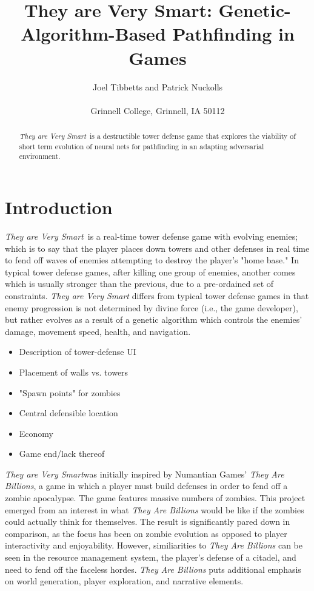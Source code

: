 \documentclass[letterpaper]{article}
\title{They are Very Smart: Genetic-Algorithm-Based Pathfinding in Games}
\author{Joel Tibbetts and Patrick Nuckolls\\
\mbox{}\\
Grinnell College, Grinnell, IA 50112 \\
} %
\def\tavs{\textit{They are Very Smart}}
\begin{document}
\maketitle

\begin{abstract}
 \tavs~is a destructible tower defense game that explores the viability of short term evolution of neural nets for pathfinding in an adapting adversarial environment.
\end{abstract}

\section{Introduction}
\tavs~is a real-time tower defense game with evolving enemies; which is to say that the player places down towers and other defenses in real time to fend off waves of enemies attempting to destroy the player's "home base." In typical tower defense games, after killing one group of enemies, another comes which is usually stronger than the previous, due to a pre-ordained set of constraints. \textit{They are Very Smart} differs from typical tower defense games in that enemy progression is not determined by divine force (i.e., the game developer), but rather evolves as a result of a genetic algorithm which controls the enemies' damage, movement speed, health, and navigation.

\begin{itemize}
    \item Description of tower-defense UI
    \item Placement of walls vs. towers
    \item "Spawn points" for zombies
    \item Central defensible location
    \item Economy
    \item Game end/lack thereof
\end{itemize}


\tavs was initially inspired by Numantian Games' \textit{They Are Billions}, a game in which a player must build defenses in order to fend off a zombie apocalypse. The game features massive numbers of zombies. This project emerged from an interest in what \textit{They Are Billions} would be like if the zombies could actually think for themselves. The result is significantly pared down in comparison, as the focus has been on zombie evolution as opposed to player interactivity and enjoyability. However, similiarities to \textit{They Are Billions} can be seen in the resource management system, the player's defense of a citadel, and need to fend off the faceless hordes. \textit{They Are Billions} puts additional emphasis on world generation, player exploration, and narrative elements.
\end{document}
